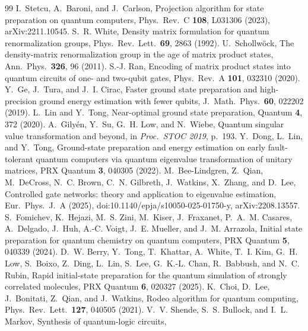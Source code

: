 \documentclass[aps,pra,twocolumn,superscriptaddress,nofootinbib]{revtex4-2}
\begin{document}
\begin{thebibliography}{99}
 I.~Stetcu, A.~Baroni, and J.~Carlson, Projection algorithm for state preparation on
  quantum computers, Phys.\ Rev.\ C \textbf{108}, L031306 (2023), arXiv:2211.10545.
 S.~R. White, Density matrix formulation for quantum renormalization groups,
  Phys.\ Rev.\ Lett.\ \textbf{69}, 2863 (1992).
 U.~Schollw\"ock, The density-matrix renormalization group in the age of matrix
  product states, Ann.\ Phys.\ \textbf{326}, 96 (2011).
 S.-J. Ran, Encoding of matrix product states into quantum circuits of one- and
  two-qubit gates, Phys.\ Rev.\ A \textbf{101}, 032310 (2020).
 Y.~Ge, J.~Tura, and J.~I. Cirac, Faster ground state preparation and high-precision
  ground energy estimation with fewer qubits, J.\ Math.\ Phys.\ \textbf{60}, 022202 (2019).
 L.~Lin and Y.~Tong, Near-optimal ground state preparation, Quantum \textbf{4}, 372
  (2020).
 A.~Gily\'en, Y.~Su, G.~H. Low, and N.~Wiebe, Quantum singular value transformation
  and beyond, in \emph{Proc.\ STOC 2019}, p.~193.
 Y.~Dong, L.~Lin, and Y.~Tong, Ground-state preparation and energy estimation on
  early fault-tolerant quantum computers via quantum eigenvalue transformation of unitary matrices,
  PRX Quantum \textbf{3}, 040305 (2022).
 M.~Bee-Lindgren, Z.~Qian, M.~DeCross, N.~C. Brown, C.~N. Gilbreth, J.~Watkins,
  X.~Zhang, and D.~Lee, Controlled gate networks: theory and application to eigenvalue estimation,
  Eur.\ Phys.\ J.\ A (2025), doi:10.1140/epja/s10050-025-01750-y, arXiv:2208.13557.
 S.~Fomichev, K.~Hejazi, M.~S. Zini, M.~Kiser, J.~Fraxanet, P.~A.~M. Casares,
  A.~Delgado, J.~Huh, A.-C. Voigt, J.~E. Mueller, and J.~M. Arrazola, Initial state preparation for
  quantum chemistry on quantum computers, PRX Quantum \textbf{5}, 040339 (2024).
 D.~W. Berry, Y.~Tong, T.~Khattar, A.~White, T.~I. Kim, G.~H. Low, S.~Boixo, Z.~Ding,
  L.~Lin, S.~Lee, G.~K.-L. Chan, R.~Babbush, and N.~C. Rubin, Rapid initial-state preparation for the
  quantum simulation of strongly correlated molecules, PRX Quantum \textbf{6}, 020327 (2025).
 K.~Choi, D.~Lee, J.~Bonitati, Z.~Qian, and J.~Watkins, Rodeo algorithm for quantum
  computing, Phys.\ Rev.\ Lett.\ \textbf{127}, 040505 (2021).
 V.~V. Shende, S.~S. Bullock, and I.~L. Markov, Synthesis of quantum-logic circuits,

\end{thebibliography}
\end{document}
